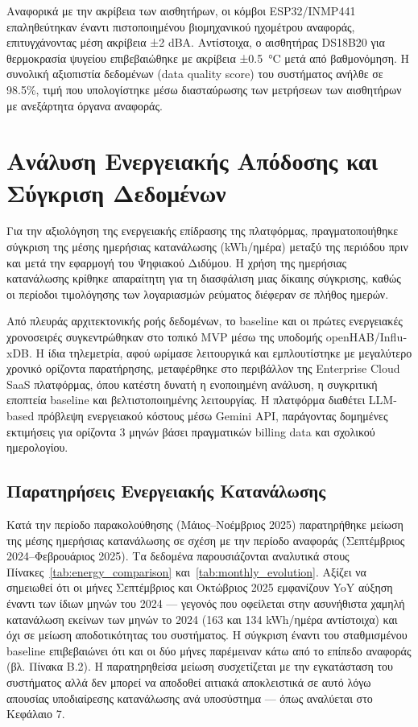 Αναφορικά με την ακρίβεια των αισθητήρων, οι κόμβοι \textlatin{ESP32/INMP441} επαληθεύτηκαν έναντι πιστοποιημένου βιομηχανικού ηχομέτρου αναφοράς, επιτυγχάνοντας μέση ακρίβεια ±2 \textlatin{dBA}. Αντίστοιχα, ο αισθητήρας \textlatin{DS18B20} για θερμοκρασία ψυγείου επιβεβαιώθηκε με ακρίβεια ±0.5~\textlatin{°C} μετά από βαθμονόμηση. Η συνολική αξιοπιστία δεδομένων (\textlatin{data quality score}) του συστήματος ανήλθε σε 98.5\%, τιμή που υπολογίστηκε μέσω διασταύρωσης των μετρήσεων των αισθητήρων με ανεξάρτητα όργανα αναφοράς.

\section{Ανάλυση Ενεργειακής Απόδοσης και Σύγκριση Δεδομένων}
Για την αξιολόγηση της ενεργειακής επίδρασης της πλατφόρμας, πραγματοποιήθηκε σύγκριση της μέσης ημερήσιας κατανάλωσης (\textlatin{kWh}/ημέρα) μεταξύ της περιόδου πριν και μετά την εφαρμογή του Ψηφιακού Διδύμου. Η χρήση της ημερήσιας κατανάλωσης κρίθηκε απαραίτητη για τη διασφάλιση μιας δίκαιης σύγκρισης, καθώς οι περίοδοι τιμολόγησης των λογαριασμών ρεύματος διέφεραν σε πλήθος ημερών.

Από πλευράς αρχιτεκτονικής ροής δεδομένων, το \textlatin{baseline} και οι πρώτες ενεργειακές χρονοσειρές συγκεντρώθηκαν στο τοπικό \textlatin{MVP} μέσω της υποδομής \textlatin{openHAB}/\textlatin{InfluxDB}. Η ίδια τηλεμετρία, αφού ωρίμασε λειτουργικά και εμπλουτίστηκε με μεγαλύτερο χρονικό ορίζοντα παρατήρησης, μεταφέρθηκε στο περιβάλλον της \textlatin{Enterprise Cloud SaaS} πλατφόρμας, όπου κατέστη δυνατή η ενοποιημένη ανάλυση, η συγκριτική εποπτεία \textlatin{baseline} και βελτιστοποιημένης λειτουργίας. Η πλατφόρμα διαθέτει \textlatin{LLM-based} πρόβλεψη ενεργειακού κόστους μέσω \textlatin{Gemini API}, παράγοντας δομημένες εκτιμήσεις για ορίζοντα 3 μηνών βάσει πραγματικών \textlatin{billing data} και σχολικού ημερολογίου.

\subsection{Παρατηρήσεις Ενεργειακής Κατανάλωσης}
Κατά την περίοδο παρακολούθησης (Μάιος--Νοέμβριος 2025) παρατηρήθηκε μείωση της μέσης ημερήσιας κατανάλωσης σε σχέση με την περίοδο αναφοράς (Σεπτέμβριος 2024--Φεβρουάριος 2025). Τα δεδομένα παρουσιάζονται αναλυτικά στους Πίνακες~\ref{tab:energy_comparison} και~\ref{tab:monthly_evolution}. Αξίζει να σημειωθεί ότι οι μήνες Σεπτέμβριος και Οκτώβριος 2025 εμφανίζουν \textlatin{YoY} αύξηση έναντι των ίδιων μηνών του 2024 --- γεγονός που οφείλεται στην ασυνήθιστα χαμηλή κατανάλωση εκείνων των μηνών το 2024 (163 και 134 \textlatin{kWh}/ημέρα αντίστοιχα) και όχι σε μείωση αποδοτικότητας του συστήματος. Η σύγκριση έναντι του σταθμισμένου \textlatin{baseline} επιβεβαιώνει ότι και οι δύο μήνες παρέμειναν κάτω από το επίπεδο αναφοράς (βλ. Πίνακα Β.2). Η παρατηρηθείσα μείωση συσχετίζεται με την εγκατάσταση του συστήματος αλλά δεν μπορεί να αποδοθεί αιτιακά αποκλειστικά σε αυτό λόγω απουσίας υποδιαίρεσης κατανάλωσης ανά υποσύστημα --- όπως αναλύεται στο Κεφάλαιο 7.

